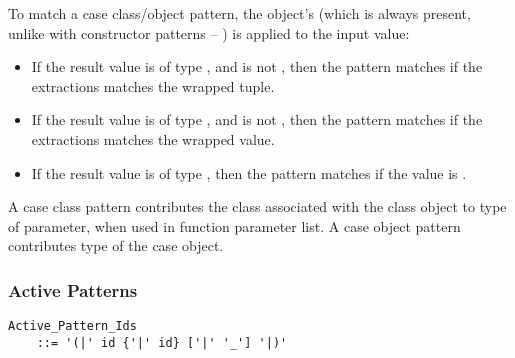 To match a case class/object pattern, the object's  (which is always present, unlike with constructor patterns -- ) is applied to the input value:
\begin{itemize}
  \item If the result value is of type , and is not , then the pattern matches if the extractions matches the wrapped tuple. 
  \item If the result value is of type , and is not , then the pattern matches if the extractions matches the wrapped value. 
  \item If the result value is of type , then the pattern matches if the value is . 
\end{itemize} 

A case class pattern contributes the class associated with the class object to type of parameter, when used in function parameter list. A case object pattern contributes type of the case object. 





\subsubsection{Active Patterns}
\label{sec:active-patterns}

\grammar\begin{lstlisting}
Active_Pattern_Ids 
    ::= '(|' id {'|' id} ['|' '_'] '|)'
\end{lstlisting}


